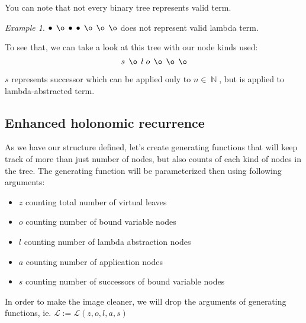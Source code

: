 \documentclass[final]{article}
\theoremstyle{definition}
\theoremstyle{remark}
\newtheorem{example}{Example}[subsection]
\newcommand{\gf}[1]{\ensuremath{\mathcal{#1}}}
\DeclareMathOperator{\N}{\mathbb{N}}
\DeclareMathOperator{\n}{\bullet}
\DeclareMathOperator{\no}{\o}
\begin{document}
You can note that not every binary tree represents valid term.

\begin{example}
    \(\n\; \no\; \n\; \n\; \no\; \no\; \no\) does not represent valid lambda term.
\end{example}

To see that, we can take a look at this tree with our node kinds used:
    \[s\; \no\; l\; o\; \no\; \no\; \no\]

\(s\) represents successor which can be applied only to \(n \in \N\), but is applied to lambda-abstracted term.

\subsection{Enhanced holonomic recurrence}%
\label{sub:enhanced_holonomic_reccurence}

As we have our structure defined, let's create generating functions that will keep track of more than just number of nodes, but also counts of each kind of nodes in the tree. The generating function will be parameterized then using following arguments:
\begin{itemize}
    \item \(z\) counting total number of virtual leaves
    \item \(o\) counting number of bound variable nodes
    \item \(l\) counting number of lambda abstraction nodes
    \item \(a\) counting number of application nodes
    \item \(s\) counting number of successors of bound variable nodes
\end{itemize}

In order to make the image cleaner, we will drop the arguments of generating functions, ie. \(\gf{L} := \gf{L}(z, o, l, a, s)\)
\end{document}
